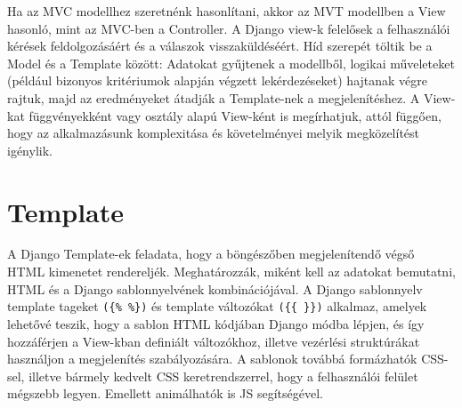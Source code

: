 Ha az MVC modellhez szeretnénk hasonlítani, akkor az MVT modellben a View hasonló, mint az MVC-ben a Controller.
A Django view-k felelősek a felhasználói kérések feldolgozásáért és a válaszok visszaküldéséért. Híd szerepét töltik be a Model és a Template között: Adatokat gyűjtenek a modellből, logikai műveleteket (például bizonyos kritériumok alapján végzett lekérdezéseket) hajtanak végre rajtuk, majd az eredményeket átadják a Template-nek a megjelenítéshez.
A View-kat függvényekként vagy osztály alapú View-ként is megírhatjuk, attól függően, hogy az alkalmazásunk komplexitása és követelményei melyik megközelítést igénylik.\cite{MVT_Design}

\section{Template}

A Django Template-ek feladata, hogy a böngészőben megjelenítendő végső HTML kimenetet rendereljék. Meghatározzák, miként kell az adatokat bemutatni, HTML és a Django sablonnyelvének kombinációjával.
A Django sablonnyelv template tageket \verb|({% %})| és template változókat \verb|({{ }})| alkalmaz, amelyek lehetővé teszik, hogy a sablon HTML kódjában Django módba lépjen, és így hozzáférjen a View-kban definiált változókhoz, illetve vezérlési struktúrákat használjon a megjelenítés szabályozására.
A sablonok továbbá formázhatók CSS-sel, illetve bármely kedvelt CSS keretrendszerrel, hogy a felhasználói felület mégszebb legyen. Emellett animálhatók is JS segítségével.\cite{MVT_Design}




